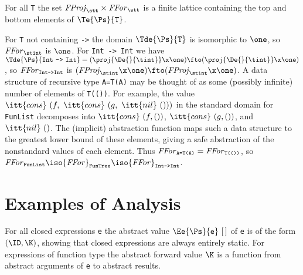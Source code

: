 For all \mbox{\tt T} the set ${\it{}FProj}_{\subtypespace\stt}\times{\it{}FFor}_{\subtypespace\stt}$ is a 
finite lattice containing the top and bottom elements of $\Te{\Ps}{\mbox{\tt T}}$.

For \mbox{\tt T} not containing \mbox{\tt ->} the domain $\Tde{\Ps}{\mbox{\tt T}}$ is isomorphic
to $\one$, so ${\it{}FFor}_{\subtypespace\stint}$ is $\one$.  For \mbox{\tt Int}\ \mbox{\tt ->}\ \mbox{\tt Int}
we have
$\Tde{\Ps}{\mbox{\tt Int}\ \mbox{\tt ->}\ \mbox{\tt Int}}=(\proj{\De{}{\tint}}\x\one)\fto(\proj{\De{}{\tint}}\x\one)$,
so ${\it{}FFor}_{\subtypespace{\makebox{\subtypesize\tt Int->Int}} }$ is
$({\it{}FProj}_{\subtypespace\stint}\x\one)\fto({\it{}FProj}_{\subtypespace\stint}\x\one)$.  A
data structure of recursive type \mbox{\tt A=T(A)} may be thought of as some
(possibly infinite) number of elements of \mbox{\tt T(())}.  For example, the
value $\itt{cons}\ (f,\ \itt{cons}\ (g,\ \itt{nil}\ ()))$ in the
standard domain for \mbox{\tt FunList} decomposes into $\itt{cons}\ (f,())$,
$\itt{cons}\ (g,())$, and $\itt{nil}\ ()$.  The (implicit) abstraction
function maps such a data structure to the greatest lower bound of
these elements, giving a safe abstraction of the nonstandard values of
each element.  Thus
${\it{}FFor}_{\subtypespace{\makebox{\subtypesize\tt A=T(A)}} }={\it{}FFor}_{\subtypespace{\makebox{\subtypesize\tt T(())}} }$, so
${\it{}FFor}_{\subtypespace{\makebox{\subtypesize\tt FunList}} }\iso{\it{}FFor}_{\subtypespace{\makebox{\subtypesize\tt FunTree}} }\iso{\it{}FFor}_{\subtypespace{\makebox{\subtypesize\tt Int->Int}} }$.



\section{Examples of Analysis}

For all closed expressions \mbox{\tt e} the abstract value
$\Ee{\Ps}{\mbox{\tt e}}~[\,]$ of \mbox{\tt e} is of the form $(\ID,\K)$, showing
that closed expressions are always entirely static.  For expressions of
function type the abstract forward value $\K$ is a function from
abstract arguments of \mbox{\tt e} to abstract results.

